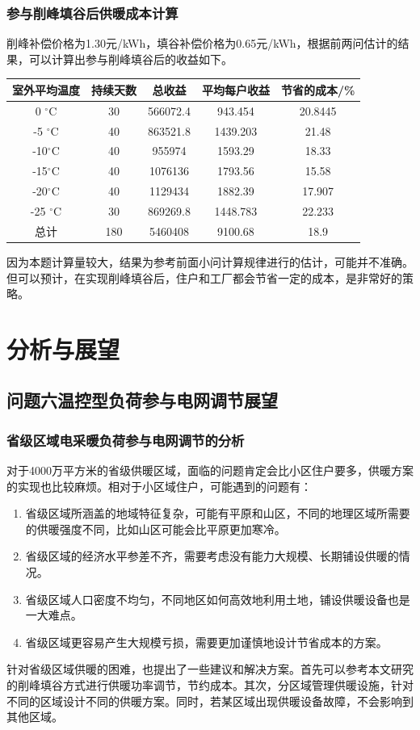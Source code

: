 \documentclass[withoutpreface,bwprint]{cumcmthesis} %
\begin{document}
\subsubsection{参与削峰填谷后供暖成本计算}
削峰补偿价格为1.30元/kWh，填谷补偿价格为0.65元/kWh，根据前两问估计的结果，可以计算出参与削峰填谷后的收益如下。
\begin{table}[H]
		\centering
\begin{tabular}{|c|c|c|c|c|}\hline
室外平均温度 &持续天数& 总收益 & 平均每户收益 &节省的成本/\% \\ \hline
0 $^\circ$C &30 &    566072.4 & 943.454 &  20.8445 \\ \hline
-5 $^\circ$C & 40& 863521.8 & 1439.203 & 21.48\\ \hline
  -10$^\circ$C &40 & 955974 & 1593.29& 18.33\\ \hline
   -15$^\circ$C &40 & 1076136 & 1793.56& 15.58\\ \hline
   -20$^\circ$C & 40&  1129434 &1882.39 & 17.907\\ \hline
    -25 $^\circ$C & 30 &869269.8 &1448.783& 22.233\\ \hline
    总计&180 & 5460408 & 9100.68 &18.9\\ \hline
\end{tabular}
\end{table}
因为本题计算量较大，结果为参考前面小问计算规律进行的估计，可能并不准确。但可以预计，在实现削峰填谷后，住户和工厂都会节省一定的成本，是非常好的策略。
\section{分析与展望}
\subsection{问题六\quad 温控型负荷参与电网调节展望}
\subsubsection{省级区域电采暖负荷参与电网调节的分析}
对于4000万平方米的省级供暖区域，面临的问题肯定会比小区住户要多，供暖方案的实现也比较麻烦。相对于小区域住户，可能遇到的问题有：
\begin{enumerate}
	\item 省级区域所涵盖的地域特征复杂，可能有平原和山区，不同的地理区域所需要的供暖强度不同，比如山区可能会比平原更加寒冷。
	\item 省级区域的经济水平参差不齐，需要考虑没有能力大规模、长期铺设供暖的情况。
	\item 省级区域人口密度不均匀，不同地区如何高效地利用土地，铺设供暖设备也是一大难点。
	\item 省级区域更容易产生大规模亏损，需要更加谨慎地设计节省成本的方案。
\end{enumerate}
针对省级区域供暖的困难，也提出了一些建议和解决方案。首先可以参考本文研究的削峰填谷方式进行供暖功率调节，节约成本。其次，分区域管理供暖设施，针对不同的区域设计不同的供暖方案。同时，若某区域出现供暖设备故障，不会影响到其他区域。
\end{document}
